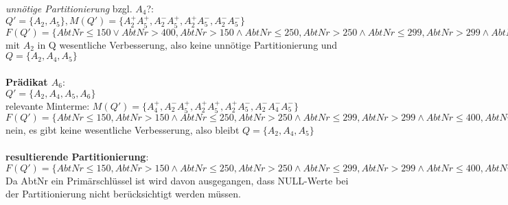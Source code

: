 \documentclass[a4paper]{article}
\begin{document}
\textit{unnötige Partitionierung} bzgl. $ A_4 $?: \\
$ Q' = \{A_2, A_5 \}, M(Q') = \{ A_2^+ A_5^+, A_2^- A_5^+, A_2^+ A_5^-, A_2^- A_5^- \} $\\
$ F(Q') = \{ AbtNr\leq 150 \vee AbtNr > 400, AbtNr >150 \wedge AbtNr \leq 250, AbtNr>250 \wedge AbtNr \leq 299, AbtNr >299 \wedge AbtNr \leq 400\} $
mit $ A_2 $ in Q wesentliche Verbesserung, also keine unnötige Partitionierung und $ Q = \{ A_2, A_4, A_5 \} $\\
\\
\textbf{Prädikat $ A_6 $}:\\
$ Q' = \{ A_2, A_4, A_5, A_6 \} $\\
relevante Minterme: $ M(Q') = \{ A_4^+, A_2^- A_5^+, A_2^+ A_5^+, A_2^+ A_5^-, A_2^- A_4^- A_5^- \} $\\
$ F(Q') = \{ AbtNr\leq 150, AbtNr >150 \wedge AbtNr \leq 250, AbtNr>250 \wedge AbtNr \leq 299, AbtNr >299 \wedge AbtNr \leq 400, AbtNr > 400 \} $\\
nein, es gibt keine wesentliche Verbesserung, also bleibt $ Q = \{ A_2, A_4, A_5 \} $ \\
\\
\textbf{resultierende Partitionierung}:\\
$ F(Q') = \{ AbtNr\leq 150, AbtNr >150 \wedge AbtNr \leq 250, AbtNr>250 \wedge AbtNr \leq 299, AbtNr >299 \wedge AbtNr \leq 400, AbtNr > 400 \} $\\
Da AbtNr ein Primärschlüssel ist wird davon ausgegangen, dass NULL-Werte bei der Partitionierung nicht berücksichtigt werden müssen. 
\end{document}
